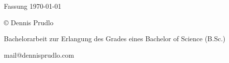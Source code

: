\maketitle
\pagestyle{empty}

Fassung \today
\mbox{}\vfill
\footnotesize{%
	© \the\year{} Dennis Prudlo\par
	Bachelorarbeit zur Erlangung des Grades eines Bachelor of Science (B.Sc.)\par
	mail@dennisprudlo.com
}
\restoregeometry
\clearpage
